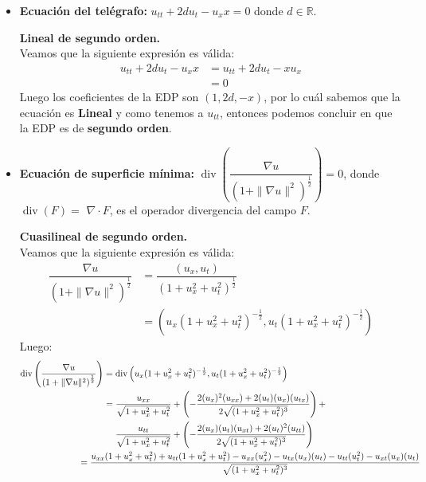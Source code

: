 \begin{homeworkProblem}
\begin{itemize}
\item \textbf{Ecuación del telégrafo:} $u_{tt}+2du_{t}-u_{x}x=0$ donde $d \in \mathbb{R}$.
    \begin{solucion}
        \textbf{Lineal de segundo orden.}\\
        Veamos que la siguiente expresión es válida:
        \begin{align*}
            u_{tt}+2du_{t}-u_{x}x&=u_{tt}+2du_{t}-xu_{x}\\
            &=0
        \end{align*}
        Luego los coeficientes de la EDP son $(1,2d,-x)$, por lo cuál sabemos que la ecuación es \textbf{Lineal} y como tenemos a $u_{tt}$, entonces podemos concluir en que la EDP es de \textbf{segundo orden}.
    \end{solucion}
\newpage
\item \textbf{Ecuación de superficie mínima:} $\operatorname{div}\left(\dfrac{\nabla u}{\left(1+\|\nabla u\|^2\right)^{\frac{1}{2}}}\right)=0$, donde $\operatorname{div}(F)=$ $\nabla \cdot F$, es el operador divergencia del campo $F$.
    \begin{solucion}
        \textbf{Cuasilineal de segundo orden.}\\
        Veamos que la siguiente expresión es válida:
        \begin{align*}
            \dfrac{\nabla u}{\left(1+\|\nabla u\|^2\right)^{\frac{1}{2}}}&=\dfrac{\left(u_x,u_t\right)}{(1+u_x^2+u_t^2)^{\frac{1}{2}}}\\
            &=\left(u_x(1+u_x^2+u_t^2)^{-\frac{1}{2}},u_t(1+u_x^2+u_t^2)^{-\frac{1}{2}}\right)
        \end{align*}
        Luego:
        \begin{align*}
            \operatorname{div}\left(\dfrac{\nabla u}{\left(1+\|\nabla u\|^2\right)^{\frac{1}{2}}}\right)&=\operatorname{div}\left(u_x(1+u_x^2+u_t^2)^{-\frac{1}{2}},u_t(1+u_x^2+u_t^2)^{-\frac{1}{2}}\right)\\
            &=\frac{u_{xx}}{\sqrt{1+u_x^2+u_t^2}}+\left(-\frac{2(u_x)^2(u_{xx})+2(u_t)(u_x)(u_{tx})}{2\sqrt{(1+u_x^2+u_t^2)^3}}\right)+\\
            &\phantom{=.}\frac{u_{tt}}{\sqrt{1+u_x^2+u_t^2}}+\left(-\frac{2(u_x)(u_t)(u_{xt})+2(u_t)^2(u_{tt})}{2\sqrt{(1+u_x^2+u_t^2)^3}}\right)\\
            &\hspace{-1cm}=\frac{u_{xx}(1+u_x^2+u_t^2)+u_{tt}(1+u_x^2+u_t^2)-u_{xx}(u_x^2)-u_{tx}(u_x)(u_t)-u_{tt}(u_t^2)-u_{xt}(u_x)(u_t)}{\sqrt{(1+u_x^2+u_t^2)^3}}\\

\end{align*}
\end{solucion}
\end{itemize}
\end{homeworkProblem}
